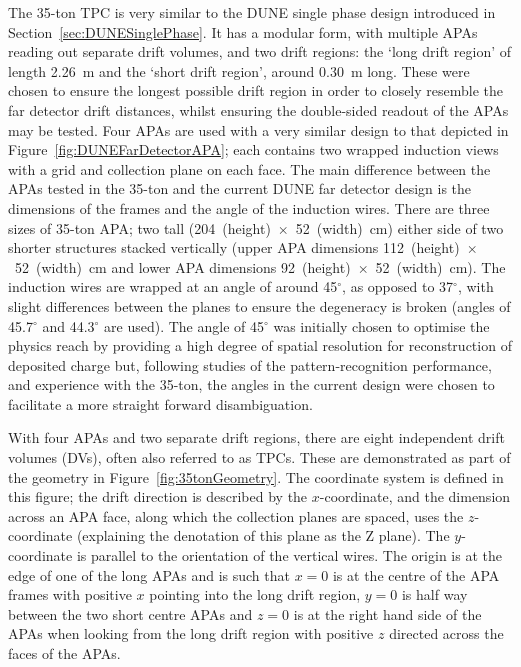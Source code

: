 The 35-ton TPC is very similar to the DUNE single phase design introduced in Section~\ref{sec:DUNESinglePhase}.  It has a modular form, with multiple APAs reading out separate drift volumes, and two drift regions: the `long drift region' of length 2.26~m and the `short drift region', around 0.30~m long.  These were chosen to ensure the longest possible drift region in order to closely resemble the far detector drift distances, whilst ensuring the double-sided readout of the APAs may be tested.  Four APAs are used with a very similar design to that depicted in Figure~\ref{fig:DUNEFarDetectorAPA}; each contains two wrapped induction views with a grid and collection plane on each face.  The main difference between the APAs tested in the 35-ton and the current DUNE far detector design is the dimensions of the frames and the angle of the induction wires.  There are three sizes of 35-ton APA; two tall (204~(height)~$\times$~52~(width)~cm) either side of two shorter structures stacked vertically (upper APA dimensions 112~(height)~$\times$~52~(width)~cm and lower APA dimensions 92~(height)~$\times$~52~(width)~cm).  The induction wires are wrapped at an angle of around 45$^{\circ}$, as opposed to 37$^{\circ}$, with slight differences between the planes to ensure the degeneracy is broken (angles of 45.7$^{\circ}$ and 44.3$^{\circ}$ are used).  The angle of 45$^{\circ}$ was initially chosen to optimise the physics reach by providing a high degree of spatial resolution for reconstruction of deposited charge but, following studies of the pattern-recognition performance, and experience with the 35-ton, the angles in the current design were chosen to facilitate a more straight forward disambiguation.

With four APAs and two separate drift regions, there are eight independent drift volumes (DVs), often also referred to as TPCs.  These are demonstrated as part of the geometry in Figure~\ref{fig:35tonGeometry}.  The coordinate system is defined in this figure; the drift direction is described by the $x$-coordinate, and the dimension across an APA face, along which the collection planes are spaced, uses the $z$-coordinate (explaining the denotation of this plane as the Z plane).  The $y$-coordinate is parallel to the orientation of the vertical wires.  The origin is at the edge of one of the long APAs and is such that $x=0$ is at the centre of the APA frames with positive $x$ pointing into the long drift region, $y=0$ is half way between the two short centre APAs and $z=0$ is at the right hand side of the APAs when looking from the long drift region with positive $z$ directed across the faces of the APAs.

